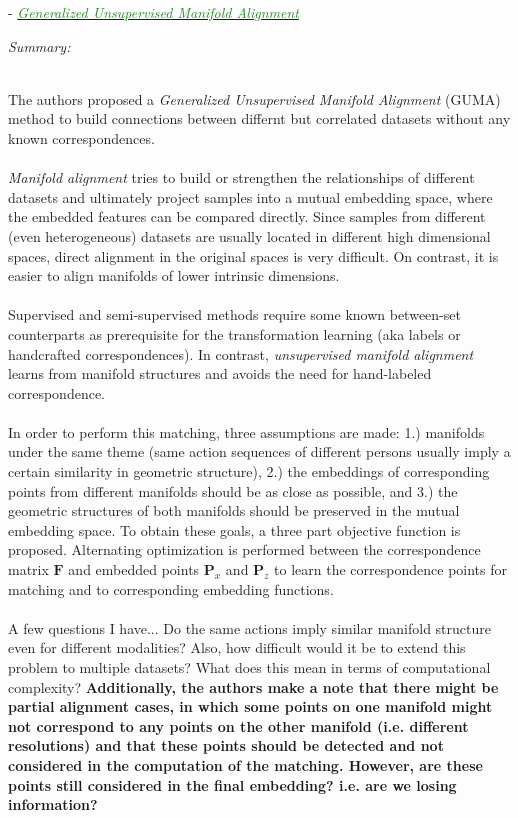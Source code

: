 \documentclass[]{article}
\newcommand{\paperentry}[4]{
            \hangindent=1cm
            \textcolor{red}{\cite{#1}} - \href{run:../References/#3}{\textcolor{ForestGreen}{\textit{#2}}}
            
            \noindent            
            \begin{minipage}[t]{0.1\linewidth}\hfill\end{minipage}
            \begin{minipage}[t]{0.8\linewidth}\textcolor{NavyBlue}{{\textit{Summary:}}}#4\end{minipage}
            \vspace{.25cm}
          }
\begin{document}
		\paperentry{Cui2014GenUnsupManifoldAlignment}
		{Generalized Unsupervised Manifold Alignment}
		{Manifold_Representation_Learning/AlignmentCui2014GenUnsupManifoldAlignment/.pdf}
		{}\\
		The authors proposed a \textit{Generalized Unsupervised Manifold Alignment} (GUMA) method to build connections between differnt but correlated datasets without any known correspondences.
		\\ \\
		\textit{Manifold alignment} tries to build or strengthen the relationships of different datasets and ultimately project samples into a mutual embedding space, where the embedded features can be compared directly.  Since samples from different (even heterogeneous) datasets are usually located in different high dimensional spaces, direct alignment in the original spaces is very difficult.  On contrast, it is easier to align manifolds of lower intrinsic dimensions.
		\\ \\
		Supervised and semi-supervised methods require some known between-set counterparts as prerequisite for the transformation learning (aka labels or handcrafted correspondences).  In contrast, \textit{unsupervised manifold alignment} learns from manifold structures and avoids the need for hand-labeled correspondence.
		\\ \\
		In order to perform this matching, three assumptions are made: 1.) manifolds under the same theme (same action sequences of different persons usually imply a certain similarity in geometric structure), 2.) the embeddings of corresponding points from different manifolds should be as close as possible, and 3.) the geometric structures of both manifolds should be preserved in the mutual embedding space.  To obtain these goals, a three part objective function  is proposed.  Alternating optimization is performed between the correspondence matrix $\bm{F}$ and embedded points $\bm{P}_{x}$ and $\bm{P}_{z}$ to learn the correspondence points for matching and to corresponding embedding functions.
		\\ \\
		A few questions I have... Do the same actions imply similar manifold structure even for different modalities?  Also, how difficult would it be to extend this problem to multiple datasets?  What does this mean in terms of computational complexity? \textbf{Additionally, the authors make a note that there might be partial alignment cases, in which some points on one manifold might not correspond to any points on the other manifold (i.e. different resolutions) and that these points should be detected and not considered in the computation of the matching.  However, are these points still considered in the final embedding? i.e. are we losing information?}\\
		
\end{document}
